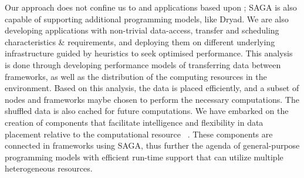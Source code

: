 \documentclass[3p,twocolumn]{elsarticle}
\begin{document}
Our approach does not confine us to \mr and applications based upon
\mr; SAGA is also capable of supporting additional programming models,
like Dryad.  We are also developing applications with non-trivial
data-access, transfer and scheduling characteristics \& requirements,
and deploying them on different underlying infrastructure guided by
heuristics to seek optimised performance.
This analysis is done through developing performance models of
transferring data between frameworks, as well as the distribution of
the computing resources in the environment. Based on this analysis,
the data is placed efficiently, and a subset of nodes and frameworks
maybe chosen to perform the necessary computations. The shuffled data
is also cached for future computations.  We have embarked on the
creation of components that facilitate intelligence and flexibility in
data placement relative to the computational resource
~\cite{saga_dic_royalsoc09}. These components are connected in
frameworks using SAGA, thus further the agenda of general-purpose
programming models with efficient run-time support that can utilize
multiple heterogeneous resources.




\end{document}
